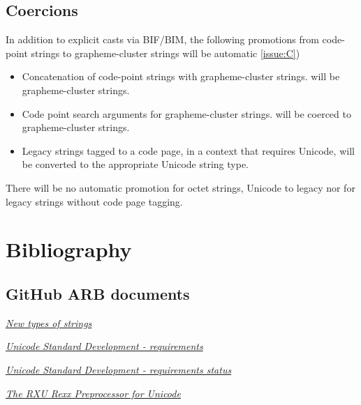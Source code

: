 \documentclass[b4paper]{article}
\begin{document}
\subsection{Coercions}
In addition to explicit casts via BIF/BIM, the following promotions
from code-point strings to grapheme-cluster strings will be automatic
\cref{issue:C})

\begin{itemize}
\item Concatenation of code-point strings with grapheme-cluster strings.
will be grapheme-cluster strings.
\item Code point search arguments for grapheme-cluster strings.
will be coerced to grapheme-cluster strings.
\item Legacy strings tagged to a code page, in a context that requires Unicode,
will be converted to the appropriate Unicode string type.
\end{itemize}

There will be no automatic promotion for octet strings, Unicode to
legacy nor for legacy strings without code page tagging.


\section{Bibliography}

\subsection{GitHub ARB documents}
\renewcommand{\refname}{ARB}

\begin{thebibliography}{20}
\href{https://github.com/RexxLA/rexx-repository/edit/master/ARB/standards/work-in-progress/unicode/UnicodeTools/doc/string-types.md}%
{\textit{New types of strings}}

\href{https://github.com/users/RexxLA/projects/2/views/6}%
{\textit{Unicode Standard Development - requirements}}

\href{https://github.com/users/RexxLA/projects/2/views/1}%
{\textit{Unicode Standard Development - requirements status}}

\href{https://github.com/RexxLA/rexx-repository/blob/master/ARB/standards/work-in-progress/unicode/UnicodeTools/rxu.md}%
{\textit{The RXU Rexx Preprocessor for Unicode}}

\end{thebibliography}
\end{document}
